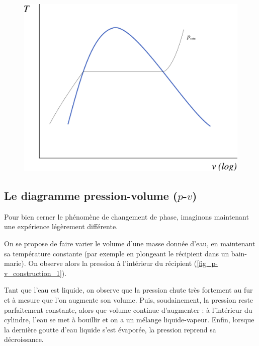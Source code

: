 		\begin{figure}
			\begin{center}
				\includegraphics[width=\didacticpvdiagramwidth]{images/tv_liquidevapeur.png}
			\end{center}
			\label{fig_t-v_eau}
		\end{figure}


	\subsection{Le diagramme pression-volume ($p$-$v$)}
	\label{ch_lv_bain_marie}

		Pour bien cerner le phénomène de changement de phase, imaginons maintenant une expérience légèrement différente.
		
		On se propose de faire varier le volume d’une masse donnée d’eau, en maintenant sa température constante (par exemple en plongeant le récipient dans un bain-marie). On observe alors la pression à l’intérieur du récipient (\cref{fig_p-v_construction_1}).
		
		Tant que l’eau est liquide, on observe que la pression chute très fortement au fur et à mesure que l’on augmente son volume. Puis, soudainement, la pression reste parfaitement constante, alors que volume continue d’augmenter : à l’intérieur du cylindre, l’eau se met à bouillir et on a un mélange liquide-vapeur. Enfin, lorsque la dernière goutte d’eau liquide s’est évaporée, la pression reprend sa décroissance.


